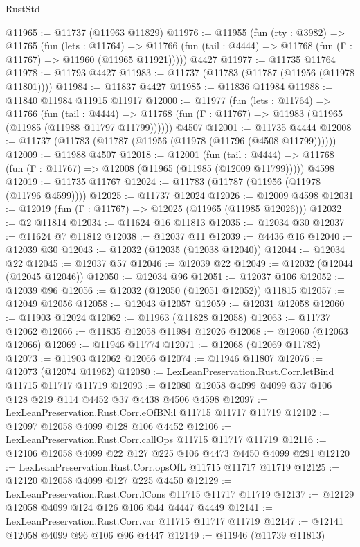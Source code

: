 \begin{lexlean}{RustStd}
\begin{coremodule}
@11965 := @11737 (@11963 @11829)
@11976 := @11955
    (fun (rty : @3982) =>
    @11765
      (fun (lets : @11764) =>
      @11766 (fun (tail : @4444) => @11768 (fun (Γ : @11767) => @11960 (@11965 @11921)))))
    @4427
@11977 := @11735 @11764
@11978 := @11793 @4427
@11983 := @11737 (@11783 (@11787 (@11956 (@11978 @11801))))
@11984 := @11837 @4427
@11985 := @11836 @11984
@11988 := @11840 @11984 @11915 @11917
@12000 := @11977
    (fun (lets : @11764) =>
    @11766
      (fun (tail : @4444) =>
      @11768 (fun (Γ : @11767) => @11983 (@11965 (@11985 (@11988 @11797 @11799))))))
    @4507
@12001 := @11735 @4444
@12008 := @11737 (@11783 (@11787 (@11956 (@11978 (@11796 (@4508 @11799))))))
@12009 := @11988 @4507
@12018 := @12001
    (fun (tail : @4444) => @11768 (fun (Γ : @11767) => @12008 (@11965 (@11985 (@12009 @11799)))))
    @4598
@12019 := @11735 @11767
@12024 := @11783 (@11787 (@11956 (@11978 (@11796 @4599))))
@12025 := @11737 @12024
@12026 := @12009 @4598
@12031 := @12019 (fun (Γ : @11767) => @12025 (@11965 (@11985 @12026)))
@12032 := @2 @11814
@12034 := @11624 @16 @11813
@12035 := @12034 @30
@12037 := @11624 @7 @11812
@12038 := @12037 @11
@12039 := @4436 @16
@12040 := @12039 @30
@12043 := @12032 (@12035 (@12038 @12040))
@12044 := @12034 @22
@12045 := @12037 @57
@12046 := @12039 @22
@12049 := @12032 (@12044 (@12045 @12046))
@12050 := @12034 @96
@12051 := @12037 @106
@12052 := @12039 @96
@12056 := @12032 (@12050 (@12051 @12052)) @11815
@12057 := @12049 @12056
@12058 := @12043 @12057
@12059 := @12031 @12058
@12060 := @11903 @12024
@12062 := @11963 (@11828 @12058)
@12063 := @11737 @12062
@12066 := @11835 @12058 @11984 @12026
@12068 := @12060 (@12063 @12066)
@12069 := @11946 @11774
@12071 := @12068 (@12069 @11782)
@12073 := @11903 @12062 @12066
@12074 := @11946 @11807
@12076 := @12073 (@12074 @11962)
@12080 := LexLeanPreservation.Rust.Corr.letBind @11715 @11717 @11719
@12093 := @12080 @12058 @4099 @4099 @37 @106 @128 @219 @114 @4452 @37 @4438 @4506 @4598
@12097 := LexLeanPreservation.Rust.Corr.eOfBNil @11715 @11717 @11719
@12102 := @12097 @12058 @4099 @128 @106 @4452
@12106 := LexLeanPreservation.Rust.Corr.callOps @11715 @11717 @11719
@12116 := @12106 @12058 @4099 @22 @127 @225 @106 @4473 @4450 @4099 @291
@12120 := LexLeanPreservation.Rust.Corr.opsOfL @11715 @11717 @11719
@12125 := @12120 @12058 @4099 @127 @225 @4450
@12129 := LexLeanPreservation.Rust.Corr.lCons @11715 @11717 @11719
@12137 := @12129 @12058 @4099 @124 @126 @106 @44 @4447 @4449
@12141 := LexLeanPreservation.Rust.Corr.var @11715 @11717 @11719
@12147 := @12141 @12058 @4099 @96 @106 @96 @4447
@12149 := @11946 (@11739 @11813)

\end{coremodule}
\end{lexlean}
